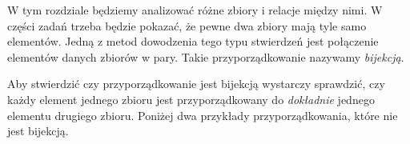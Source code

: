 

\noindent
W tym rozdziale będziemy analizować różne zbiory i relacje między nimi. W części zadań trzeba będzie pokazać, że pewne dwa zbiory mają tyle samo elementów. Jedną z metod dowodzenia tego typu stwierdzeń jest połączenie elementów danych zbiorów w pary. Takie przyporządkowanie nazywamy \textit{bijekcją}.

\begin{center}
\end{center}

\vspace{10px}

\noindent
Aby stwierdzić czy przyporządkowanie jest bijekcją wystarczy sprawdzić, czy każdy element jednego zbioru jest przyporządkowany do \textit{dokładnie} jednego elementu drugiego zbioru. Poniżej dwa przykłady przyporządkowania, które nie jest bijekcją.

